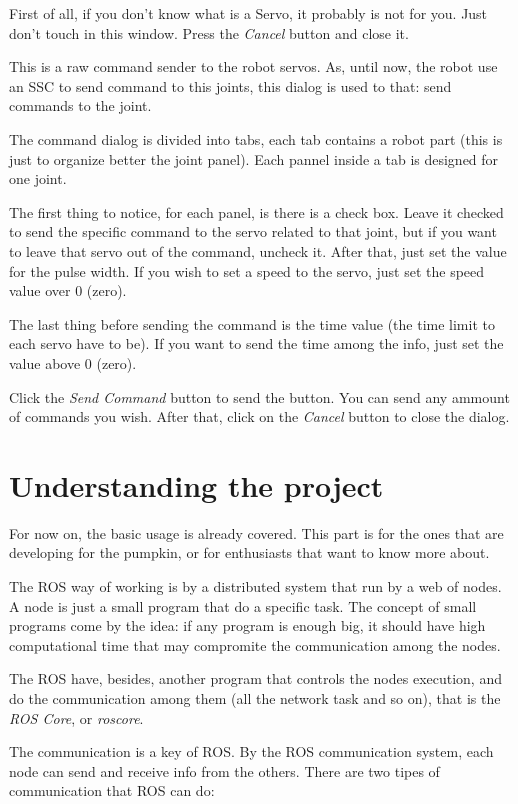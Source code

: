 \documentclass[oneside,a4paper,titlepage]{article}
\begin{document}
First of all, if you don't know what is a Servo, it probably is not for you. Just don't touch in this window. Press the \emph{Cancel} button and close it.

This is a raw command sender to the robot servos. As, until now, the robot use an SSC to send command to this joints, this dialog is used to that: send commands to the joint.

The command dialog is divided into tabs, each tab contains a robot part (this is just to organize better the joint panel). Each pannel inside a tab is designed for one joint.

The first thing to notice, for each panel, is there is a check box. Leave it checked to send the specific command to the servo related to that joint, but if you want to leave that servo out of the command, uncheck it. After that, just set the value for the pulse width. If you wish to set a speed to the servo, just set the speed value over $0$ (zero).

The last thing before sending the command is the time value (the time limit to each servo have to be). If you want to send the time among the info, just set the value above $0$ (zero).

Click the \emph{Send Command} button to send the button. You can send any ammount of commands you wish. After that, click on the \emph{Cancel} button to close the dialog.

\section{Understanding the project}

For now on, the basic usage is already covered. This part is for the ones that are developing for the pumpkin, or for enthusiasts that want to know more about.

The ROS way of working is by a distributed system that run by a web of nodes. A node is just a small program that do a specific task. The concept of small programs come by the idea: if any program is enough big, it should have high computational time that may compromite the communication among the nodes.

The ROS have, besides, another program that controls the nodes execution, and do the communication among them (all the network task and so on), that is the \emph{ROS Core}, or \emph{roscore}.

The communication is a key of ROS. By the ROS communication system, each node can send and receive info from the others. There are two tipes of communication that ROS can do:
\end{document}

